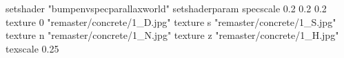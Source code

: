setshader "bumpenvspecparallaxworld"
setshaderparam specscale 0.2 0.2 0.2
    texture 0 "remaster/concrete/1_D.jpg"
    texture s "remaster/concrete/1_S.jpg"
    texture n "remaster/concrete/1_N.jpg"
    texture z "remaster/concrete/1_H.jpg"
    texscale 0.25
